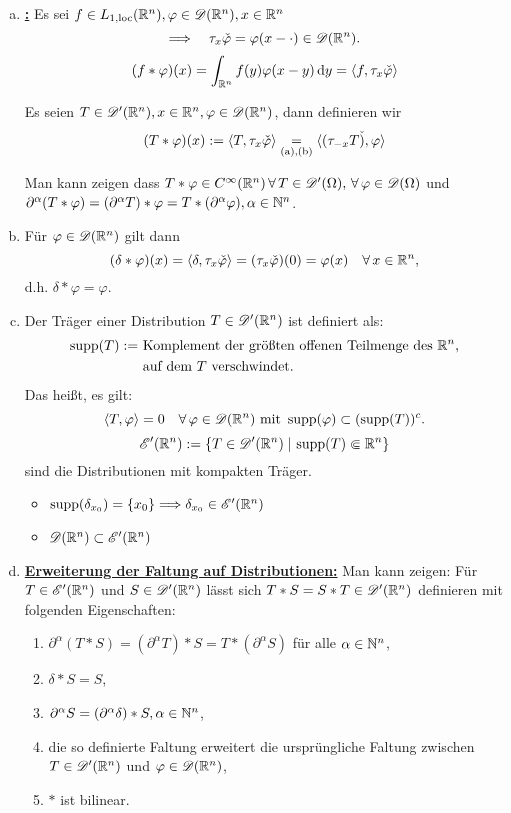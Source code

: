 \begin{bemdef}
\begin{enumerate}[(a)]
  \item \textbf{\underline{:}} Es sei $f\in L_{1,\scriptsize{\textnormal{loc}}}(\mathbb{R}^n), \varphi\in\mathscr{D}(\mathbb{R}^n), x\in\mathbb{R}^n$
    \[ \Longrightarrow\quad\tau_x\check\varphi=\varphi(x-\cdot)\in\mathscr{D}(\mathbb{R}^n). \]
    \[( f\ast \varphi)(x)=\int_{\mathbb{R}^n}f(y)\varphi(x-y)\,\mathrm{d} y=\langle f,\tau_x\check\varphi\rangle \]
    \begin{defi}
      Es seien $T\in\mathscr{D}'(\mathbb{R}^n), x\in\mathbb{R}^n, \varphi\in\mathscr{D}(\mathbb{R}^n)$, dann definieren wir
      \[ 
     ( T\ast \varphi)(x):=\langle T,\tau_x\check\varphi\rangle\underset{\scriptsize\text{(a),(b)}}
      =\langle(\tau_{-x}T\check),\varphi\rangle
      \]
    \end{defi}
    Man kann zeigen dass $T\ast\varphi\in C^\infty(\mathbb{R}^n) \, \forall \, T \in \mathscr{D}'(\Omega), \, \forall \, \varphi \in \mathscr{D}(\Omega)$ und $\partial^\alpha(T\ast\varphi)=(\partial^\alpha T)\ast\varphi=T\ast(\partial^\alpha\varphi), \alpha\in\mathbb{N}^n$.
  \item Für $\varphi\in\mathscr{D}(\mathbb{R}^n)$ gilt dann 
    \[
  (  \delta\ast\varphi)(x)=\langle\delta,\tau_x\check\varphi\rangle=(\tau_x\check\varphi)(0)=\varphi(x)\quad\forall \,x\in\mathbb{R}^n,
    \]
    d.h. $\delta\ast\varphi=\varphi$.
  \item Der Träger einer Distribution $T\in\mathscr{D}'(\mathbb{R}^n)$ ist definiert als:
    \begin{align*}
      \operatorname{supp}(T):=&\text{ Komplement der größten offenen Teilmenge des $\mathbb{R}^n$,} \\
      &\text{ auf dem $T$ verschwindet.}
  \end{align*}
  Das heißt, es gilt:
  \[
  \langle T,\varphi\rangle=0\quad\forall\,\varphi\in\mathscr{D}(\mathbb{R}^n)\text{ mit }\operatorname{supp}(\varphi)
  \subset(\operatorname{supp}(T))^c.
  \]
  \[
    \mathscr{E}'(\mathbb{R}^n):=\{ T\in\mathscr{D}'(\mathbb{R}^n)\;\vert\, \operatorname{supp}(T)\Subset\mathbb{R}^n \} 
  \]
      sind die Distributionen mit kompakten Träger.
  \begin{bsp*}
    \begin{itemize}
    \item $\operatorname{supp}(\delta_{x_0})=\{x_0\}\Longrightarrow\delta_{x_0}\in\mathscr{E}'(\mathbb{R}^n)$
    \item $\mathscr{D}(\mathbb{R}^n)\subset\mathscr{E}'(\mathbb{R}^n)$
    \end{itemize}
  \end{bsp*}
\item \textbf{\underline{Erweiterung der Faltung auf Distributionen:}}
  Man kann zeigen: \newline
   Für $T\in\mathscr{E}'(\mathbb{R}^n)$ und $S\in\mathscr{D}'(\mathbb{R}^n)$ lässt sich $T\ast S=S\ast T\in\mathscr{D}'(\mathbb{R}^n)$ definieren mit folgenden Eigenschaften:
  \begin{enumerate}[\rm(i)]
  \item $\partial^\alpha(T\ast S)=(\partial^\alpha T)\ast S=T\ast(\partial^\alpha S)$ für alle $\alpha\in\mathbb{N}^n$,
  \item $\delta\ast S=S$,
  \item $\partial^\alpha S=(\partial^\alpha\delta)\ast S, \alpha\in\mathbb{N}^n$,
  \item die so definierte Faltung erweitert die ursprüngliche Faltung zwischen $T \in \mathscr{D}'( \mathbb{R}^n)$ und $\varphi \in \mathscr{D}(\mathbb{R}^n)$,
  \item $\ast$ ist bilinear.
  \end{enumerate}
\end{enumerate}
\end{bemdef}
